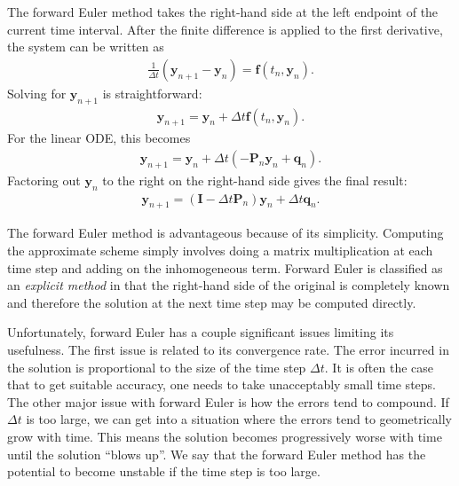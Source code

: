 The forward Euler method takes the right-hand side at the left endpoint of the current time interval. After the finite difference is applied to the first derivative, the system can be written as
\begin{align}
   \frac{1}{\Delta t}  \left( \mathbf{y}_{n+1} - \mathbf{y}_n \right) = \mathbf{f}( t_n, \mathbf{y}_n ).
\end{align}
Solving for $\mathbf{y}_{n+1}$ is straightforward:
\begin{align}
  \mathbf{y}_{n+1} = \mathbf{y}_n + \Delta t \mathbf{f}( t_n, \mathbf{y}_n ).
\end{align}
For the linear ODE, this becomes
\begin{align}
  \mathbf{y}_{n+1} = \mathbf{y}_n + \Delta t \left( -\mathbf{P}_n \mathbf{y}_n + \mathbf{q}_n \right).
\end{align}
Factoring out $\mathbf{y}_n$ to the right on the right-hand side gives the final result:
\begin{align}
  \mathbf{y}_{n+1} = \left( \mathbf{I} - \Delta t \mathbf{P}_n \right) \mathbf{y}_n  + \Delta t \mathbf{q}_n.
\end{align}

The forward Euler method is advantageous because of its simplicity. Computing the approximate scheme simply involves doing a matrix multiplication at each time step and adding on the inhomogeneous term. Forward Euler is classified as an \emph{explicit method} in that the right-hand side of the original is completely known and therefore the solution at the next time step may be computed directly.

Unfortunately, forward Euler has a couple significant issues limiting its usefulness. The first issue is related to its convergence rate. The error incurred in the solution is proportional to the size of the time step $\Delta t$. It is often the case that to get suitable accuracy, one needs to take unacceptably small time steps. The other major issue with forward Euler is how the errors tend to compound. If $\Delta t$ is too large, we can get into a situation where the errors tend to geometrically grow with time. This means the solution becomes progressively worse with time until the solution ``blows up''. We say that the forward Euler method has the potential to become unstable if the time step is too large.

